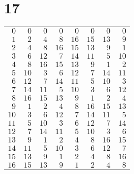 \documentclass[a4paper]{scrartcl}
\begin{document}
\section*{17}
\begin{tabular}{rrrrrrrr}
\toprule
$0$ & $0$ & $0$ & $0$ & $0$ & $0$ & $0$ & $0$ \\
$1$ & $2$ & $4$ & $8$ & $16$ & $15$ & $13$ & $9$ \\
$2$ & $4$ & $8$ & $16$ & $15$ & $13$ & $9$ & $1$ \\
$3$ & $6$ & $12$ & $7$ & $14$ & $11$ & $5$ & $10$ \\
$4$ & $8$ & $16$ & $15$ & $13$ & $9$ & $1$ & $2$ \\
$5$ & $10$ & $3$ & $6$ & $12$ & $7$ & $14$ & $11$ \\
$6$ & $12$ & $7$ & $14$ & $11$ & $5$ & $10$ & $3$ \\
$7$ & $14$ & $11$ & $5$ & $10$ & $3$ & $6$ & $12$ \\
$8$ & $16$ & $15$ & $13$ & $9$ & $1$ & $2$ & $4$ \\
$9$ & $1$ & $2$ & $4$ & $8$ & $16$ & $15$ & $13$ \\
$10$ & $3$ & $6$ & $12$ & $7$ & $14$ & $11$ & $5$ \\
$11$ & $5$ & $10$ & $3$ & $6$ & $12$ & $7$ & $14$ \\
$12$ & $7$ & $14$ & $11$ & $5$ & $10$ & $3$ & $6$ \\
$13$ & $9$ & $1$ & $2$ & $4$ & $8$ & $16$ & $15$ \\
$14$ & $11$ & $5$ & $10$ & $3$ & $6$ & $12$ & $7$ \\
$15$ & $13$ & $9$ & $1$ & $2$ & $4$ & $8$ & $16$ \\
$16$ & $15$ & $13$ & $9$ & $1$ & $2$ & $4$ & $8$ \\
\bottomrule
\end{tabular}
\end{document}
